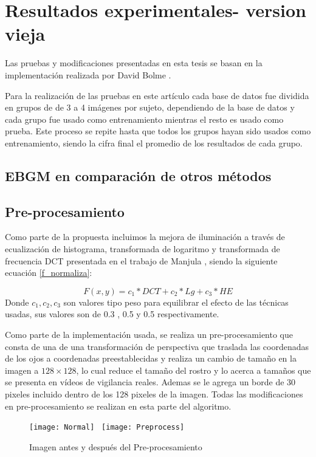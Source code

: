 \chapter{Resultados experimentales- version vieja}

Las pruebas y modificaciones presentadas en esta tesis se basan en la implementación realizada por David Bolme \cite{bolme2003elastic}.

Para la realización de las pruebas en este artículo cada base de datos fue dividida en grupos de de 3 a 4 imágenes por sujeto, dependiendo de la base de datos y cada grupo fue usado como entrenamiento mientras el resto es usado como prueba. Este proceso se repite hasta que todos los grupos hayan sido usados como entrenamiento, siendo la cifra final el promedio de los resultados de cada grupo.

\section{\ac{EBGM} en comparación de otros métodos}


\section{Pre-procesamiento}
Como parte de la propuesta incluimos la mejora de iluminación a través de ecualización de histograma, transformada de logaritmo y transformada de frecuencia DCT presentada en el trabajo de Manjula \cite{manjulaimage}, siendo la siguiente ecuación \ref{f_normaliza}:

\begin{equation}
	F(x,y) = c_{1}*DCT + c_{2}*Lg + c_{3}*HE
\end{equation}
Donde $c_{1}, c_{2}, c_{3}$ son valores tipo peso para equilibrar el efecto de las técnicas usadas, sus valores son de 0.3 , 0.5 y 0.5 respectivamente.


Como parte de la implementación usada, se realiza un pre-procesamiento que consta de una de una transformación de perspectiva que traslada las coordenadas de los ojos a coordenadas preestablecidas y realiza un cambio de tamaño en la imagen a $128 \times 128$, lo cual reduce el tamaño del rostro y lo acerca a tamaños que se presenta en vídeos de vigilancia reales. Ademas se le agrega un borde de 30 pixeles incluido dentro de los 128 pixeles de la imagen. Todas las modificaciones en pre-procesamiento se realizan en esta parte del algoritmo.

\begin{figure}[h]

	\center
    \label{Pre-procesamiento}
    \texttt{[image: Normal]}
    \,
    \texttt{[image: Preprocess]}
    \center
    \caption{Imagen antes y después del Pre-procesamiento}
\end{figure}
